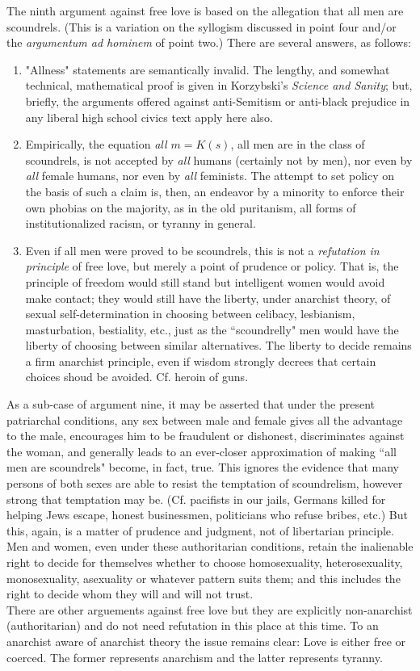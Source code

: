\documentclass[12pt, onecolumn, letterpaper, oneside]{book}
\begin{document}
The ninth argument against free love is based on the allegation that all men are scoundrels. (This is a variation on the syllogism discussed in point four and/or the \emph{argumentum ad hominem} of point two.) There are several answers, as follows:
\begin{enumerate}
\item "Allness" statements are semantically invalid. The lengthy, and somewhat technical, mathematical proof is given in Korzybski's \emph{Science and Sanity}; but, briefly, the arguments offered against anti-Semitism or anti-black prejudice in any liberal high school civics text apply here also.
\item Empirically, the equation \emph{all $m = K(s)$}, all men are in the class of scoundrels, is not accepted by \emph{all} humans (certainly not by men), nor even by \emph{all} female humans, nor even by \emph{all} feminists. The attempt to set policy on the basis of such a claim is, then, an endeavor by a minority to enforce their own phobias on the majority, as in the old puritanism, all forms of institutionalized racism, or tyranny in general.
\item Even if all men were proved to be scoundrels, this is not a \emph{refutation in principle} of free love, but merely a point of prudence or policy. That is, the principle of freedom would still stand but intelligent women would avoid make contact; they would still have the liberty, under anarchist theory, of sexual self-determination in choosing between celibacy, lesbianism, masturbation, bestiality, etc., just as the ``scoundrelly" men would have the liberty of choosing between similar alternatives. The liberty to decide remains a firm anarchist principle, even if wisdom strongly decrees that certain choices shoud be avoided. Cf. heroin of guns.
\end{enumerate}
As a sub-case of argument nine, it may be asserted that under the present patriarchal conditions, any sex between male and female gives all the advantage to the male, encourages him to be fraudulent or dishonest, discriminates against the woman, and generally leads to an ever-closer approximation of making ``all men are scoundrels" become, in fact, true. This ignores the evidence that many persons of both sexes are able to resist the temptation of scoundrelism, however strong that temptation may be. (Cf. pacifists in our jails, Germans killed for helping Jews escape, honest businessmen, politicians who refuse bribes, etc.) But this, again, is a matter of prudence and judgment, not of libertarian principle. Men and women, even under these authoritarian conditions, retain the inalienable right to decide for themselves whether to choose homosexuality, heterosexuality, monosexuality, asexuality or whatever pattern suits them; and this includes the right to decide whom they will and will not trust.\\
There are other arguements against free love but they are explicitly non-anarchist (authoritarian) and do not need refutation in this place at this time. To an anarchist aware of anarchist theory the issue remains clear: Love is either free or coerced. The former represents anarchism and the latter represents tyranny.
\end{document}
